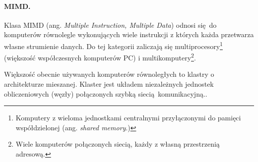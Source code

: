 \paragraph{MIMD.}
Klasa MIMD  (ang. \emph{Multiple Instruction, Multiple Data})
odnosi się do komputerów równolegle wykonujących wiele instrukcji z których każda przetwarza własne strumienie danych. Do tej kategorii zaliczają się multiprocesory\footnote{Komputery z wieloma jednostkami centralnymi przyłączonymi do pamięci współdzielonej (ang. \emph{shared memory}.)} (większość współczesnych komputerów PC) i multikomputery\footnote{Wiele komputerów połączonych siecią, każdy z własną przestrzenią adresową.}. 


Większość obecnie używanych komputerów równoległych to klastry o architekturze mieszanej. Klaster jest układem niezależnych jednostek obliczeniowych (węzły) połączonych szybką siecią komunikacyjną.\cite{OstrowskiByszewski}. 